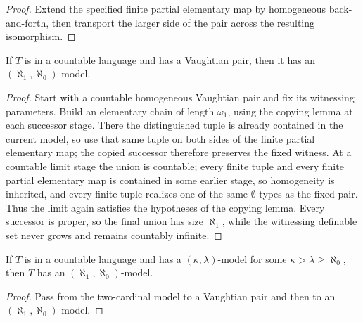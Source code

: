 \begin{proof}
Extend the specified finite partial elementary map by homogeneous
back-and-forth, then transport the larger side of the pair across the
resulting isomorphism.
\end{proof}

\begin{theorem}
\label{thm:vaughtian-pair-gives-aleph-one-aleph-zero-model}
If \(T\) is in a countable language and has a Vaughtian pair, then it
has an \((\aleph_1,\aleph_0)\)-model.
\end{theorem}

\begin{proof}
Start with a countable homogeneous Vaughtian pair and fix its witnessing
parameters.  Build an elementary chain of length \(\omega_1\), using the
copying lemma at each successor stage.  There the distinguished tuple is
already contained in the current model, so use that same tuple on both
sides of the finite partial elementary map; the copied successor
therefore preserves the fixed witness.  At a countable limit stage the
union is countable; every finite tuple and every finite partial
elementary map is contained in some earlier stage, so homogeneity is
inherited, and every finite tuple realizes one of the same
\(\emptyset\)-types as the fixed pair.  Thus the limit again satisfies
the hypotheses of the copying lemma.  Every successor is proper, so the
final union has size \(\aleph_1\), while the witnessing definable set
never grows and remains countably infinite.
\end{proof}

\begin{theorem}
\label{thm:vaught-two-cardinal}
If \(T\) is in a countable language and has a \((\kappa,\lambda)\)-model
for some \(\kappa>\lambda\geq\aleph_0\), then \(T\) has an
\((\aleph_1,\aleph_0)\)-model.
\end{theorem}

\begin{proof}
Pass from the two-cardinal model to a Vaughtian pair and then to an
\((\aleph_1,\aleph_0)\)-model.
\end{proof}

